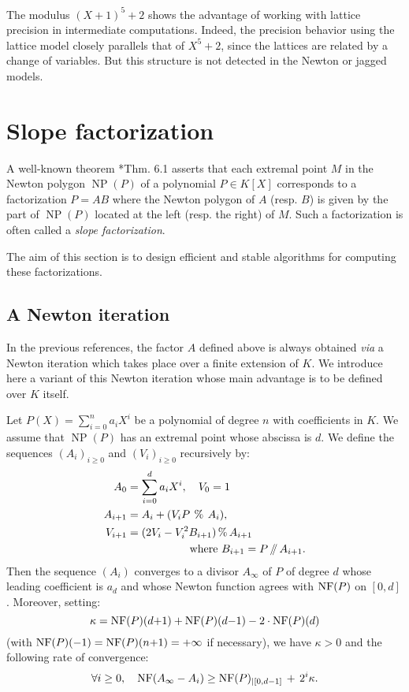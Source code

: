 \documentclass{sig-alternate-2013}
\DeclareMathOperator{\NP}{NP}
\newcommand{\NF}{\text{\rm NF}}
\renewcommand{\mod}{\,\%\,}
\renewcommand{\div}{\,/\hspace{-0.3em}/\,}
\def\todo#1{\ \!\!{\color{red} #1}}
\begin{document}
The modulus $(X+1)^5 + 2$ shows the advantage of working
with lattice precision in intermediate computations.  Indeed,
the precision behavior using the lattice model closely parallels
that of $X^5+2$, since the lattices are related by a change of
variables.  But this structure is not detected in the Newton
or jagged models.

\section{Slope factorization} \label{sec:slope_fac}

A well-known theorem \cite{dwork-geratto-sullivan:Gfunctions}*{Thm. 6.1} asserts that each 
extremal point $M$ in the Newton polygon $\NP(P)$ of a polynomial $P \in 
K[X]$ corresponds to a factorization $P = AB$ where the Newton polygon 
of $A$ (resp. $B$) is given by the part of $\NP(P)$ located at the left 
(resp. the right) of $M$. Such a factorization is often called a 
\emph{slope factorization}.

The aim of this section is to design efficient and stable algorithms 
for computing these factorizations. \todo{Compare with previous
results...}

\subsection{A Newton iteration}
\label{ssec:Newtoniter}

In the previous references, the factor $A$ defined above is always 
obtained \emph{via} a Newton iteration which takes place over a finite 
extension of $K$. We introduce here a variant of this Newton iteration 
whose main advantage is to be defined over $K$ itself.

\begin{theo} \label{theo:slope-factor}
Let $P(X) = \sum_{i=0}^n a_i X^i$ be a polynomial of degree $n$ with
coefficients in $K$. We assume that $\NP(P)$ has an extremal point 
whose abscissa is $d$.
We define the sequences $(A_i)_{i \geq 0}$ and $(V_i)_{i \geq 0}$
recursively by:
\begin{align*}
A_0 & = \sum_{i=0}^d a_i X^i, \quad V_{0} = 1 \medskip \\
A_{i+1} &= A_i + (V_i P \:\mod\: A_i), \smallskip \\
V_{i+1} &= (2 V_i -V_i^2 B_{i+1} ) \mod A_{i+1} \\
& \hspace{2cm}\text{where } B_{i+1} = P \div A_{i+1}.
\end{align*}
Then the sequence $(A_i)$ converges to a divisor $A_\infty$ of $P$ 
of degree $d$ whose leading coefficient is $a_d$ and whose Newton 
function agrees with $\NF(P)$ on $[0,d]$.
Moreover, setting:
$$\kappa = \NF(P)(d{+}1) + \NF(P)(d{-}1) - 2 \cdot \NF(P)(d)$$
(with $\NF(P)(-1) = \NF(P)(n{+}1) = +\infty$ if necessary),
we have $\kappa > 0$ and the following rate of convergence:
\begin{equation}
\label{eq:rateconv}
\forall i \geq 0, \quad
\NF(A_\infty - A_i) \geq \NF(P)_{|[0,d{-}1]} \,+\, 2^i \kappa.
\end{equation}
\end{theo}
\end{document}
